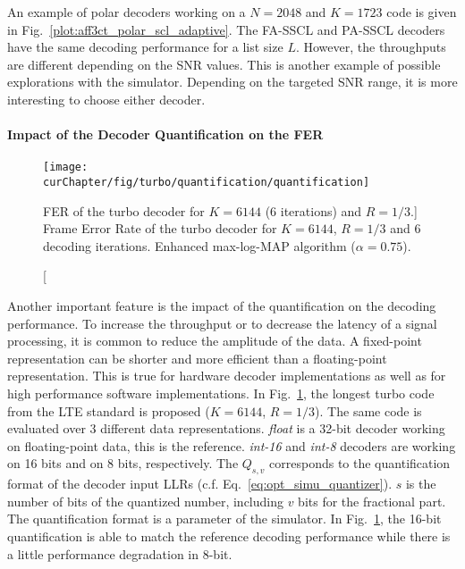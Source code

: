 An example of polar decoders working on a $N = 2048$ and $K = 1723$ code is
given in Fig.~\ref{plot:aff3ct_polar_scl_adaptive}. The FA-SSCL and PA-SSCL
decoders have the same decoding performance for a list size $L$. However,
the throughputs are different depending on the SNR values. This is another
example of possible explorations with the \AFFECT simulator. Depending on the
targeted SNR range, it is more interesting to choose either decoder.

\paragraph{Impact of the Decoder Quantification on the FER}

\begin{figure}[htp]
  \centering
  \texttt{[image: \\curChapter/fig/turbo/quantification/quantification]}
  \caption
    [FER of the turbo decoder for $K = 6144$ (6 iterations) and
     $R=1/3$.]
    {Frame Error Rate of the turbo decoder for $K = 6144$, $R=1/3$ and 6
     decoding iterations. Enhanced max-log-MAP algorithm ($\alpha = 0.75$).}
  \label{plot:aff3ct_turbo_quantification}
\end{figure}

Another important feature is the impact of the quantification on the decoding
performance. To increase the throughput or to decrease the latency of a signal
processing, it is common to reduce the amplitude of the data. A fixed-point
representation can be shorter and more efficient than a floating-point
representation. This is true for hardware decoder implementations as well as for
high performance software implementations. In
Fig.~\ref{plot:aff3ct_turbo_quantification}, the longest turbo code from the LTE
standard is proposed ($K = 6144$, $R = 1/3$). The same code is evaluated over 3
different data representations. \emph{float} is a 32-bit decoder working on
floating-point data, this is the reference. \emph{int-16} and \emph{int-8}
decoders are working on 16 bits and on 8 bits, respectively. The $Q_{s,v}$
corresponds to the quantification format of the decoder input LLRs (c.f.
Eq.~\ref{eq:opt_simu_quantizer}). $s$ is the number of bits of the quantized
number, including $v$ bits for the fractional part. The quantification format is
a parameter of the \AFFECT simulator. In
Fig.~\ref{plot:aff3ct_turbo_quantification}, the 16-bit quantification is able
to match the reference decoding performance while there is a little performance
degradation in 8-bit.

